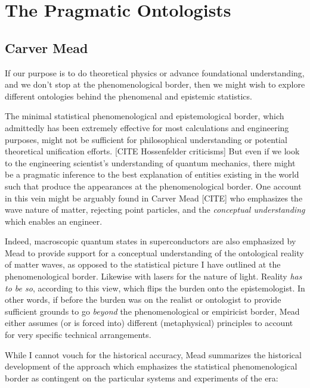 \section{The Pragmatic Ontologists}

\subsection{Carver Mead}

If our purpose is to do theoretical physics or advance foundational understanding, and we don't stop at the phenomenological border, then we might wish to explore different ontologies behind the phenomenal and epistemic statistics. 

The minimal statistical phenomenological and epistemological border, which admittedly has been extremely effective for most calculations and engineering purposes, might not be sufficient for philosophical understanding or potential theoretical unification efforts. [CITE  Hossenfelder criticisms]  But even if we look to the engineering scientist's understanding of quantum mechanics, there might be a pragmatic inference to the best explanation of entities existing in the world such that produce the appearances at the phenomenological border.  One account in this vein might be arguably found in Carver Mead [CITE] who emphasizes the wave nature of matter, rejecting point particles, and the \emph{conceptual understanding} which enables an engineer.

Indeed, macroscopic quantum states in superconductors are also emphasized by Mead to provide support for a conceptual understanding of the ontological reality of matter waves, as opposed to the statistical picture I have outlined at the phenomenological border.  Likewise with lasers for the nature of light.  Reality \emph{has to be so}, according to this view, which flips the burden onto the epistemologist.  In other words, if before the burden was on the realist or ontologist to provide sufficient grounds to go \emph{beyond} the phenomenological or empiricist border, Mead either assumes (or is forced into) different (metaphysical) principles to account for very specific technical arrangements.  

While I cannot vouch for the historical accuracy, Mead summarizes the historical development of the approach which emphasizes the statistical phenomenological border as contingent on the particular systems and experiments of the era:

